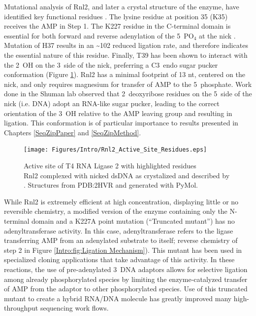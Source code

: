     Mutational analysis of Rnl2, and later a crystal structure of the enzyme, have identified key functional residues \citep{Ho2004, Nandakumar2006,Nandakumar2004a,Yin2003d}. The lysine residue at position 35 (K35) receives the AMP in Step 1. The K227 residue in the C-terminal domain is essential for both forward and reverse adenylation of the 5\textprime~PO$_4$ at the nick \citep{Viollet2011}. Mutation of H37 results in an \textasciitilde102 reduced ligation rate, and therefore indicates the essential nature of this residue. Finally, T39 has been shown to interact with the 2\textprime~OH on the 3\textprime~side of the nick, preferring a C3\textprime~endo sugar pucker conformation (Figure \ref{Intro:fig:Rnl2 Active Site Residues}). Rnl2 has a minimal footprint of 13 nt, centered on the nick, and only requires magnesium for transfer of AMP to the 5\textprime~phosphate. Work done in the Shuman lab \citep{Nandakumar2006} observed that 2\textprime~deoxyribose residues on the 5\textprime~side of the nick (i.e. DNA) adopt an RNA-like sugar pucker, leading to the correct orientation of the 3\textprime~OH relative to the AMP leaving group and resulting in ligation. This conformation is of particular importance to results presented in Chapters \ref{SeqZipPaper} and \ref{SeqZipMethod}.

    \begin{figure} %
      \centering 
      \texttt{[image: Figures/Intro/Rnl2\_Active\_Site\_Residues.eps]}
      \caption[Active site of T4 RNA Ligase 2 with highlighted residues]
      {
        Active site of T4 RNA Ligase 2 with highlighted residues\\[0.25cm]
        Rnl2 complexed with nicked dsDNA as crystalized and described by \citep{Nandakumar2006}. Structures from PDB:2HVR and generated with PyMol.
        }
      \label{Intro:fig:Rnl2 Active Site Residues}
      \end{figure}

    While Rnl2 is extremely efficient at high concentration, displaying little or no reversible chemistry, a modified version of the enzyme containing only the N-terminal domain and a K227A point mutation (“Truncated mutant”) has no adenyltransferase activity. In this case, adenyltransferase refers to the ligase transferring AMP from an adenylated substrate to itself; reverse chemistry of step 2 in Figure \ref{Intro:fig:Ligation Mechanism}). This mutant has been used in specialized cloning applications \citep{Ghildiyal2008, Hafner2008a, Viollet2011} that take advantage of this activity. In these reactions, the use of pre-adenylated 3\textprime~DNA adaptors allows for selective ligation among already phosphorylated species by limiting the enzyme-catalyzed transfer of AMP from the adaptor to other phosphorylated species. Use of this truncated mutant to create a hybrid RNA/DNA molecule has greatly improved many high-throughput sequencing work flows.

